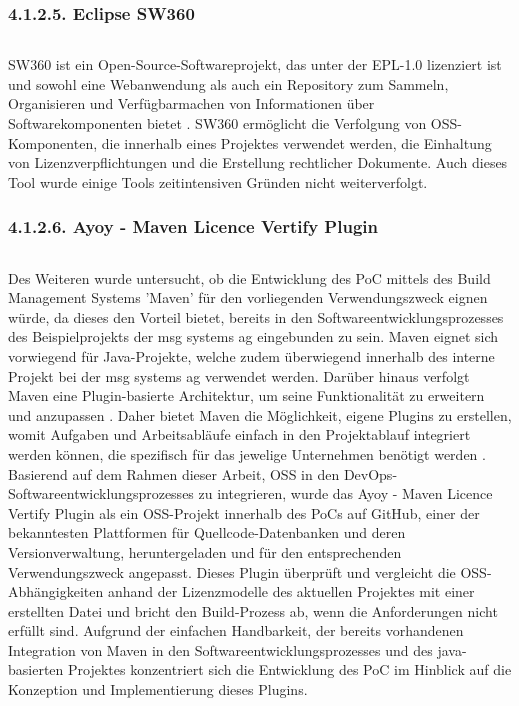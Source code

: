 \subsubsection{4.1.2.5. Eclipse SW360} $~$

SW360 ist ein Open-Source-Softwareprojekt, das unter der EPL-1.0 lizenziert ist und sowohl eine Webanwendung als auch ein Repository zum Sammeln, Organisieren und Verfügbarmachen von Informationen über Softwarekomponenten bietet \cite{the_eclipse_foundation_sw360_2018}. SW360 ermöglicht die Verfolgung von OSS-Komponenten, die innerhalb eines Projektes verwendet werden, die Einhaltung von Lizenzverpflichtungen und die Erstellung rechtlicher Dokumente. Auch dieses Tool wurde einige Tools zeitintensiven Gründen nicht weiterverfolgt.   

\subsubsection{4.1.2.6. Ayoy - Maven Licence Vertify Plugin} $~$

Des Weiteren wurde untersucht, ob die Entwicklung des PoC mittels des Build Management Systems 'Maven' für den vorliegenden Verwendungszweck eignen würde, da dieses den Vorteil bietet, bereits in den Softwareentwicklungsprozesses des Beispielprojekts der msg systems ag eingebunden zu sein. Maven eignet sich vorwiegend für Java-Projekte, welche zudem überwiegend innerhalb des interne Projekt bei der msg systems ag verwendet werden. Darüber hinaus verfolgt Maven eine Plugin-basierte Architektur, um seine Funktionalität zu erweitern und anzupassen \cite[S. 28]{spiller_maven_2011}. Daher bietet Maven die Möglichkeit, eigene Plugins zu erstellen, womit Aufgaben und Arbeitsabläufe einfach in den Projektablauf integriert werden können, die spezifisch für das jewelige Unternehmen benötigt werden \cite[S. 3]{varanasi_introducing_2019}. Basierend auf dem Rahmen dieser Arbeit, OSS in den DevOps-Softwareentwicklungsprozesses zu integrieren, wurde das Ayoy - Maven Licence Vertify Plugin \cite{allberg_ayoyabayoy-maven-license-verifier-plugin_2021} als ein OSS-Projekt innerhalb des PoCs auf GitHub, einer der bekanntesten Plattformen für Quellcode-Datenbanken und deren Versionverwaltung, heruntergeladen und für den entsprechenden Verwendungszweck angepasst. Dieses Plugin überprüft und vergleicht die OSS-Abhängigkeiten anhand der Lizenzmodelle des aktuellen Projektes mit einer erstellten Datei und bricht den Build-Prozess ab, wenn die Anforderungen nicht erfüllt sind. Aufgrund der einfachen Handbarkeit, der bereits vorhandenen Integration von Maven in den Softwareentwicklungsprozesses und des java-basierten Projektes konzentriert sich die Entwicklung des PoC im Hinblick auf die Konzeption und Implementierung dieses Plugins. 


